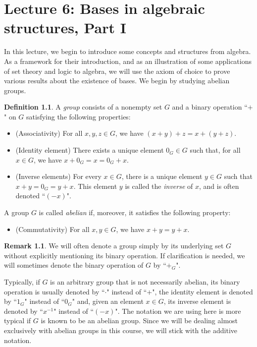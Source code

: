 \documentclass[a4paper]{memoir}
\theoremstyle{definition}
\newtheorem{definition}[theorem]{Definition}
\newtheorem{remark}[theorem]{Remark}
\begin{document}
\chapter{Lecture 6: Bases in algebraic structures, Part I}

In this lecture, we begin to introduce some concepts and structures from algebra. 
As a framework for their introduction, and as an illustration of some applications 
of set theory and logic to algebra, we will use the axiom of choice to prove various 
results about the existence of bases. We begin by studying abelian groups.

\begin{definition} \label{def: group}
  A \emph{group} consists of a nonempty set $G$ and a binary operation ``$+$" on $G$
  satisfying the following properties:
  \begin{itemize}
    \item (Associativity) For all $x,y,z \in G$, we have $(x + y) + z = x + (y+z)$.
    \item (Identity element) There exists a unique element $0_G \in G$ such that, for all 
    $x \in G$, we have $x + 0_G = x = 0_G + x$.
    \item (Inverse elements) For every $x \in G$, there is a unique element $y \in G$ 
    such that $x + y = 0_G = y + x$. This element $y$ is called the \emph{inverse} of 
    $x$, and is often denoted ``$(-x)$".
  \end{itemize}
  A group $G$ is called \emph{abelian} if, moreover, it satisfies the following property:
  \begin{itemize}
    \item (Commutativity) For all $x,y \in G$, we have $x + y = y + x$.
  \end{itemize}
\end{definition}

\begin{remark}
  We will often denote a group simply by its underlying set $G$ without explicitly 
  mentioning its binary operation. If clarification is needed, we will sometimes 
  denote the binary operation of $G$ by ``$+_G$".

  Typically, if $G$ is an arbitrary group that is not necessarily abelian, its binary operation 
  is usually denoted by ``$\cdot$" instead of ``$+$", the identity element is denoted by 
  ``$1_G$" instead of ``$0_G$" and, given an element $x \in G$, its inverse element is denoted by 
  ``$x^{-1}$" instead of ``$(-x)$". The notation we are using here is more typical if $G$ is 
  known to be an abelian group. Since we will be dealing almost exclusively with abelian groups 
  in this course, we will stick with the additive notation.
\end{remark}
\end{document}
